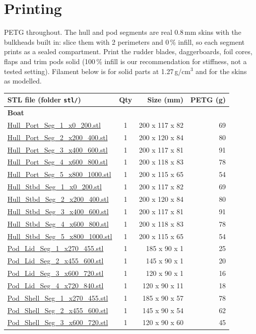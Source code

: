 \documentclass[11pt]{article}
\begin{document}
\section{Printing}
PETG throughout. The hull and pod segments are real 0.8\,mm skins with the bulkheads built in: slice them with 2 perimeters and 0\,\% infill, so each segment prints as a sealed compartment. Print the rudder blades, daggerboards, foil cores, flaps and trim pods solid (100\,\% infill is our recommendation for stiffness, not a tested setting). Filament below is for solid parts at 1.27\,g/cm$^3$ and for the skins as modelled.

{\small
\begin{longtable}{lcrr}
\toprule
STL file (folder \texttt{stl/}) & Qty & Size (mm) & PETG (g) \\
\midrule
\multicolumn{4}{l}{\textbf{Boat}}\\
\url{Hull_Port_Seg_1_x0_200.stl} & 1 & 200 x 117 x 82 & 69 \\
\url{Hull_Port_Seg_2_x200_400.stl} & 1 & 200 x 120 x 84 & 80 \\
\url{Hull_Port_Seg_3_x400_600.stl} & 1 & 200 x 117 x 81 & 91 \\
\url{Hull_Port_Seg_4_x600_800.stl} & 1 & 200 x 118 x 83 & 78 \\
\url{Hull_Port_Seg_5_x800_1000.stl} & 1 & 200 x 115 x 65 & 54 \\
\url{Hull_Stbd_Seg_1_x0_200.stl} & 1 & 200 x 117 x 82 & 69 \\
\url{Hull_Stbd_Seg_2_x200_400.stl} & 1 & 200 x 120 x 84 & 80 \\
\url{Hull_Stbd_Seg_3_x400_600.stl} & 1 & 200 x 117 x 81 & 91 \\
\url{Hull_Stbd_Seg_4_x600_800.stl} & 1 & 200 x 118 x 83 & 78 \\
\url{Hull_Stbd_Seg_5_x800_1000.stl} & 1 & 200 x 115 x 65 & 54 \\
\url{Pod_Lid_Seg_1_x270_455.stl} & 1 & 185 x 90 x 1 & 25 \\
\url{Pod_Lid_Seg_2_x455_600.stl} & 1 & 145 x 90 x 1 & 20 \\
\url{Pod_Lid_Seg_3_x600_720.stl} & 1 & 120 x 90 x 1 & 16 \\
\url{Pod_Lid_Seg_4_x720_840.stl} & 1 & 120 x 90 x 11 & 18 \\
\url{Pod_Shell_Seg_1_x270_455.stl} & 1 & 185 x 90 x 57 & 78 \\
\url{Pod_Shell_Seg_2_x455_600.stl} & 1 & 145 x 90 x 54 & 62 \\
\url{Pod_Shell_Seg_3_x600_720.stl} & 1 & 120 x 90 x 60 & 45 \\

\end{longtable}}
\end{document}
